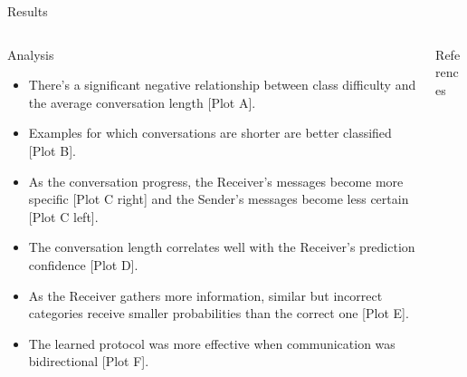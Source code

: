 \documentclass[final]{beamer}
\newlength{\onecolwid}
\newlength{\twocolwid}
\begin{document}
\begin{frame}[t]
\begin{columns}[t]
\begin{column}{\twocolwid}
\begin{block}{Results}
\end{block}

\begin{columns}[t,totalwidth=\twocolwid] %

\begin{column}{\onecolwid} %



\begin{block}{Analysis}

\begin{itemize}
\item There's a significant negative relationship between class difficulty and the average conversation length [Plot A].
\item Examples for which conversations are shorter are better classified [Plot B].
\item As the conversation progress, the Receiver's messages become more specific [Plot C right] and the Sender's messages become less certain [Plot C left].
\item The conversation length correlates well with the Receiver's prediction confidence [Plot D].
\item As the Receiver gathers more information, similar but incorrect categories receive smaller probabilities than the correct one [Plot E].
\item The learned protocol was more effective when communication was bidirectional [Plot F].
\end{itemize}

\end{block}


\end{column} %

\begin{column}{\onecolwid} %

\begin{block}{References}



\end{block}
\end{column}
\end{columns}
\end{column}
\end{columns}
\end{frame}
\end{document}
